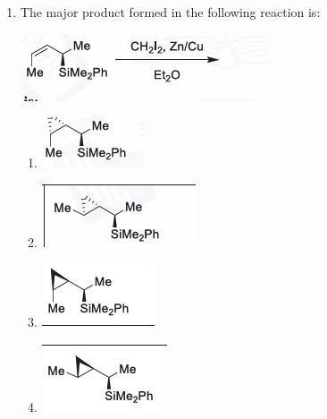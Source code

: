 \documentclass[journal,12pt,onecolumn]{IEEEtran}
\begin{document}
\begin{enumerate}
    \item The major product formed in the following reaction is: 
    \begin{center}
    \includegraphics[width=0.4\columnwidth]{figs/q12.png}
    \end{center}
    \begin{multicols}{2}
    \begin{enumerate}
        \item \includegraphics[width=0.4\columnwidth]{figs/q12a.png}
        \item \includegraphics[width=0.4\columnwidth]{figs/q12b.png}
        \item \includegraphics[width=0.4\columnwidth]{figs/q12c.png}
        \item \includegraphics[width=0.4\columnwidth]{figs/q12d.png}
    \end{enumerate}
    \end{multicols}
    \hfill{}


\end{enumerate}
\end{document}
